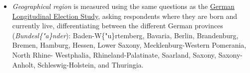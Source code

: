 \documentclass[]{article}
\begin{document}
\begin{itemize}
  them the options of \texttt{won\textquotesingle{}t\ \ say} and
  \texttt{don\textquotesingle{}t\ know}.
\item
  \emph{Geographical region} is measured using the same questions as the
  \href{https://www.gesis.org/wahlen/gles}{German Longitudinal Election
  Study}, asking respondents where they are born and currently live,
  differentiating between the different German provinces
  (\emph{Bundesl\{"a\}nder}): Baden-W\{"u\}rtemberg, Bavaria, Berlin,
  Brandenburg, Bremen, Hamburg, Hessen, Lower Saxony,
  Mecklenburg-Western Pomerania, North Rhine- Westphalia,
  Rhineland-Palatinate, Saarland, Saxony, Saxony-Anholt,
  Schleswig-Holstein, and Thuringia.
\end{itemize}

\begin{table}[!h]


\end{table}
\end{document}
